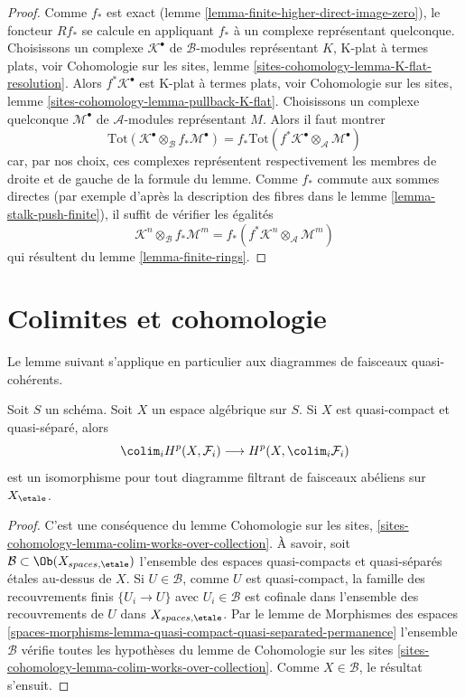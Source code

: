\begin{proof}
Comme $f_*$ est exact (lemme \ref{lemma-finite-higher-direct-image-zero}),
le foncteur $Rf_*$ se calcule en appliquant $f_*$ à un complexe représentant quelconque.
Choisissons un complexe $\mathcal{K}^\bullet$ de $\mathcal{B}$-modules
représentant $K$, K-plat à termes plats, voir
Cohomologie sur les sites, lemme \ref{sites-cohomology-lemma-K-flat-resolution}.
Alors $f^*\mathcal{K}^\bullet$ est K-plat à termes plats, voir
Cohomologie sur les sites, lemme \ref{sites-cohomology-lemma-pullback-K-flat}.
Choisissons un complexe quelconque $\mathcal{M}^\bullet$ de $\mathcal{A}$-modules
représentant $M$. Alors
il faut montrer
$$
\text{Tot}(\mathcal{K}^\bullet \otimes_\mathcal{B} f_*\mathcal{M}^\bullet)
=
f_*\text{Tot}(f^*\mathcal{K}^\bullet \otimes_\mathcal{A} \mathcal{M}^\bullet)
$$
car, par nos choix, ces complexes représentent respectivement les membres de droite et de gauche
de la formule du lemme.
Comme $f_*$ commute aux sommes directes
(par exemple d'après la description des fibres dans
le lemme \ref{lemma-stalk-push-finite}),
il suffit de vérifier les égalités
$$
\mathcal{K}^n \otimes_\mathcal{B} f_*\mathcal{M}^m
=
f_*(f^*\mathcal{K}^n \otimes_\mathcal{A} \mathcal{M}^m)
$$
qui résultent du lemme \ref{lemma-finite-rings}.
\end{proof}









\section{Colimites et cohomologie}
\label{section-colimits}

\noindent
Le lemme suivant s'applique en particulier aux diagrammes de
faisceaux quasi-cohérents.

\begin{lemma}
\label{lemma-colimits}
Soit $S$ un schéma. Soit $X$ un espace algébrique sur $S$.
Si $X$ est quasi-compact et quasi-séparé, alors
$$
\colim_i H^p(X, \mathcal{F}_i)
\longrightarrow
H^p(X, \colim_i \mathcal{F}_i)
$$
est un isomorphisme
pour tout diagramme filtrant de faisceaux abéliens sur $X_\etale$.
\end{lemma}

\begin{proof}
C'est une conséquence du lemme
Cohomologie sur les sites,
\ref{sites-cohomology-lemma-colim-works-over-collection}.
À savoir, soit $\mathcal{B} \subset \Ob(X_{spaces, \etale})$
l'ensemble des espaces quasi-compacts et quasi-séparés étales au-dessus de $X$.
Si $U \in \mathcal{B}$, comme $U$ est quasi-compact,
la famille des recouvrements finis $\{U_i \to U\}$ avec $U_i \in \mathcal{B}$
est cofinale dans l'ensemble des recouvrements de $U$ dans $X_{spaces, \etale}$. Par
le lemme de Morphismes des espaces
\ref{spaces-morphisms-lemma-quasi-compact-quasi-separated-permanence}
l'ensemble $\mathcal{B}$ vérifie toutes les hypothèses du
lemme de Cohomologie sur les sites
\ref{sites-cohomology-lemma-colim-works-over-collection}.
Comme $X \in \mathcal{B}$, le résultat s'ensuit.
\end{proof}

